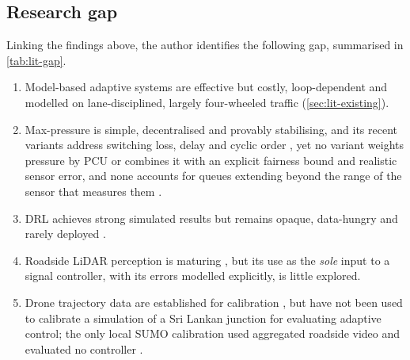 \subsection{Research gap}
Linking the findings above, the author identifies the following gap, summarised in \cref{tab:lit-gap}.
\begin{enumerate}[leftmargin=*,itemsep=2pt]
  \item Model-based adaptive systems are effective but costly, loop-dependent and modelled on lane-disciplined,
        largely four-wheeled traffic (\cref{sec:lit-existing}).
  \item Max-pressure is simple, decentralised and provably stabilising, and its recent variants address
        switching loss, delay and cyclic order
        \cite{levin2023maxpressure,liu2022novel,wang2022learning,le2015decentralized,levin2020cyclic}, yet no
        variant weights pressure by PCU or combines it with an explicit fairness bound and realistic sensor
        error, and none accounts for queues extending beyond the range of the sensor that measures them
        \cite{liu2009queue}.
  \item DRL achieves strong simulated results but remains opaque, data-hungry and rarely deployed
        \cite{wei2021recent,noaeen2022rl}.
  \item Roadside LiDAR perception is maturing \cite{sun2022object,bai2022infrastructure}, but its use as the
        \emph{sole} input to a signal controller, with its errors modelled explicitly, is little explored.
  \item Drone trajectory data are established for calibration \cite{butila2022urban,zheng2024citysim}, but have
        not been used to calibrate a simulation of a Sri Lankan junction for evaluating adaptive control; the
        only local SUMO calibration used aggregated roadside video and evaluated no controller
        \cite{salawavidana2026aggregate}.
\end{enumerate}


